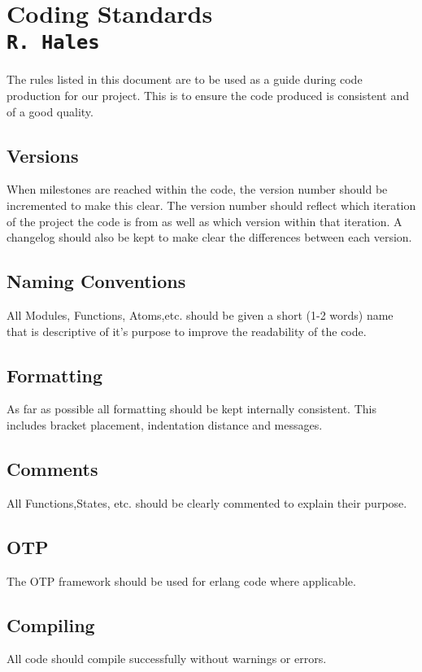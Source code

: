 \pagestyle{empty}
\section{Coding Standards\\{\small\tt R.~Hales}}
The rules listed in this document are to be used as a guide during code production for our project. This is to ensure the code produced is consistent and of a good quality.

\subsection{Versions}
When milestones are reached within the code, the version number should be incremented to make this clear. The version number should reflect which iteration of the project the code is from as well as which version within that iteration. A changelog should also be kept to make clear the differences between each version.
\subsection{Naming Conventions}
All Modules, Functions, Atoms,etc. should be given a short (1-2 words) name that is descriptive of it's purpose to improve the readability of the code.
\subsection{Formatting}
As far as possible all formatting should be kept internally consistent. This includes bracket placement, indentation distance and messages.
\subsection{Comments}
All Functions,States, etc. should be clearly commented to explain their purpose.
\subsection{OTP}
The OTP framework should be used for erlang code where applicable.
\subsection{Compiling}
All code should compile successfully without warnings or errors.
\clearpage
\endinput
